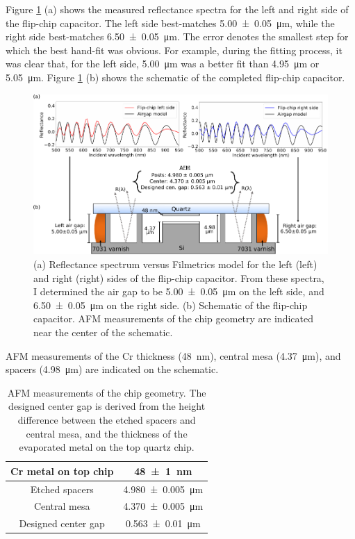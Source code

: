 \documentclass[double,12pt,1in,seploa]{beavtex}
\begin{document}
Figure \ref{FCCap Ref Summ} (a) shows the measured reflectance spectra for the left and right side of the flip-chip capacitor. The left side best-matches \SI{5.00(5)}{\micro\meter}, while the right side best-matches \SI{6.50(5)}{\micro\meter}. The error denotes the smallest step for which the best hand-fit was obvious. For example, during the fitting process, it was clear that, for the left side, \SI{5.00}{\micro\meter} was a better fit than \SI{4.95}{\micro\meter} or \SI{5.05}{\micro\meter}. Figure \ref{FCCap Ref Summ} (b) shows the schematic of the completed flip-chip capacitor.
\begin{figure}
    \includegraphics[width = 1\textwidth]{Flip-chip capacitor reflectance summary.pdf}
    \caption{(a) Reflectance spectrum versus Filmetrics model for the left (left) and right (right) sides of the flip-chip capacitor. From these spectra, I determined the air gap to be \SI{5.00(5)}{\micro\meter} on the left side, and \SI{6.50(5)}{\micro\meter} on the right side. (b) Schematic of the flip-chip capacitor. AFM measurements of the chip geometry are indicated near the center of the schematic.}
    \label{FCCap Ref Summ}
\end{figure}
AFM measurements of the Cr thickness (\SI{48}{\nano\meter}), central mesa (\SI{4.37}{\micro\meter}), and spacers (\SI{4.98}{\micro\meter}) are indicated on the schematic.

\begin{table}
    \centering
    \begin{tabular}{|c|c|}
        \hline
        Cr metal on top chip & \SI{48(1)}{\nano\meter} \\
        \hline
        Etched spacers & \SI{4.980(5)}{\micro\meter} \\
        \hline
        Central mesa & \SI{4.370(5)}{\micro\meter} \\
        \hline
        \hline
        Designed center gap & \SI{0.563(10)}{\micro\meter} \\
        \hline
    \end{tabular}
    \caption{AFM measurements of the chip geometry. The designed center gap is derived from the height difference between the etched spacers and central mesa, and the thickness of the evaporated metal on the top quartz chip.}
    \label{flip-chip AFM table}
\end{table}
\end{document}

